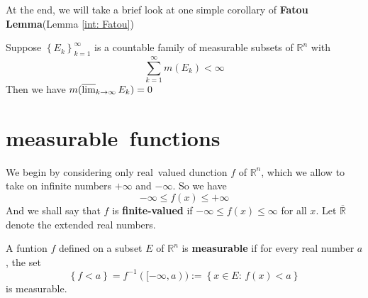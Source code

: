 \documentclass{ctexbook}
\begin{document}
At the end, we will take a brief look at one simple corollary of \textbf{Fatou Lemma}(Lemma \ref{int: Fatou})
\begin{lema}
    Suppose $\left\{E_k\right\}_{k=1}^\infty$ is a countable family of measurable subsets of $\mathbb{R}^n$ with 
    \[\sum_{k=1}^\infty m(E_k) < \infty\]
    Then we have $m(\varlimsup_{k\rightarrow\infty}E_k) = 0$
\end{lema}

\section{measurable~functions}

We begin by considering only real~valued dunction $f$ of $\mathbb{R}^n$, which we allow to take on infinite numbers $+\infty$ and 
$-\infty$. So we have \[-\infty \leq f(x) \leq +\infty\]And we shall say that $f$ is \textbf{finite-valued} if $-\infty \leq f(x) \leq \infty$
for all $x$. Let $\overline{\mathbb{R}}$ denote the extended real numbers.

\begin{define}
    A funtion $f$ defined on a subset $E$ of $\mathbb{R}^n$ is \textbf{measurable} if for every real number $a$, the set
    \[\left\{f < a\right\} =f^{-1}([-\infty,a)):= \left\{x \in E:\, f(x)<a\right\} \]
    is measurable.
\end{define}
\end{document}
